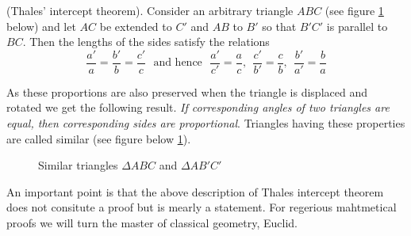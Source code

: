 \begin{theorem}
(Thales’ intercept theorem). Consider an arbitrary triangle $ABC$ (see figure \ref{geo:similar-triangles} below) and let $AC$  be extended to $C'$ and $AB$ to $B'$ so that $B'C'$ is parallel to $BC$. Then the lengths of the sides satisfy the relations
\[
\frac{a'}{a} = \frac{b'}{b} = \frac{c'}{c}
\textrm{~ and hence ~}
\frac{a'}{c'} = \frac{a}{c},~~
\frac{c'}{b'} = \frac{c}{b},~~
\frac{b'}{a'} = \frac{b}{a}
\]

\end{theorem}
As these proportions are also preserved when the triangle is displaced and rotated we get the following result. \textit{If corresponding angles of two triangles are equal, then corresponding sides are proportional}. Triangles having these properties are called similar (see figure below \ref{geo:similar-triangles}).
\begin{figure}[H]
\label{geo:similar-triangles}
\centering
{}
\caption{Similar triangles $\Delta ABC$ and $\Delta AB'C'$}
\end{figure}

An important point is that the above description of Thales intercept theorem does not consitute a proof but is mearly a statement. For regerious mahtmetical proofs we will turn the master of classical geometry, Euclid.

